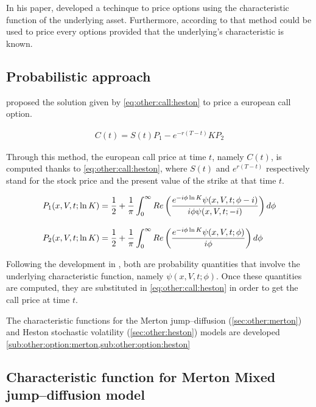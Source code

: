 \documentclass[12pt]{report}
\begin{document}
In his paper, \citet{heston1993} developed a techinque to price options using the characteristic function of the underlying asset. Furthermore, according to \citet{criso2015} that method could be used to price every options provided that the underlying's characteristic  is known.

\subsection{Probabilistic approach}
\label{sub:other:option:probabilistic}

\citet{heston1993} proposed the solution given by \cref{eq:other:call:heston} to price a european call option.

\begin{align}
  C(t) = S(t) P_1 - e^{-r(T-t)} K P_2 \label{eq:other:call:heston}
\end{align}

Through this method, the european call price at time $t$, namely $C(t)$, is computed thanks to \cref{eq:other:call:heston}, where $S(t)$ and $e^{r(T - t)}$ respectively stand for the stock price and the present value of the strike at that time $t$.

\begin{align}
  P_1(x,V,t;\ln{K}) &= \frac{1}{2} + \frac{1}{\pi} \int_0^{\infty} Re \left( \frac{e^{-i\phi\ln{K}} \psi(x,V,t;\phi - i)}{i\phi\psi(x,V,t;-i)} \right) d\phi \label{eq:other:call:heston:pi1} \\ 
  \intertext{}
  P_2(x,V,t;\ln{K}) &= \frac{1}{2} + \frac{1}{\pi} \int_0^{\infty} Re \left( \frac{e^{-i\phi\ln{K}} \psi(x,V,t;\phi)}{i\phi} \right) d\phi \label{eq:other:call:heston:pi2}
\end{align}

Following the development in \citet{criso2015},  both are probability quantities that involve the underlying characteristic function, namely $\psi(x,V,t;\phi)$. Once these quantities are computed, they are substituted in \cref{eq:other:call:heston} in order to get the call price at time $t$.

The characteristic functions for the Merton jump--diffusion (\cref{sec:other:merton}) and Heston stochastic volatility (\cref{sec:other:heston}) models are developed \cref{sub:other:option:merton,sub:other:option:heston}

\subsection{Characteristic function for Merton Mixed jump--diffusion model}
\label{sub:other:option:merton}
\end{document}
